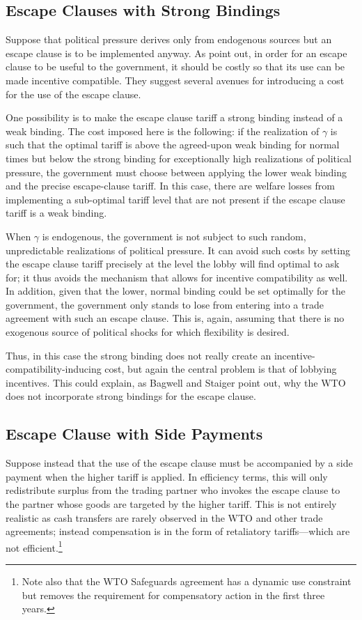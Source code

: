 \documentclass[12pt]{article}
\newcommand{\ga}{\gamma}
\begin{document}
\subsection{Escape Clauses with Strong Bindings}
Suppose that political pressure derives only from endogenous sources but an escape clause is to be implemented anyway. As \Textcite{bs2005} point out, in order for an escape clause to be useful to the government, it should be costly so that its use can be made incentive compatible. They suggest several avenues for introducing a cost for the use of the escape clause.

One possibility is to make the escape clause tariff a strong binding instead of a weak binding. The cost imposed here is the following: if the realization of $\ga$ is such that the optimal tariff is above the agreed-upon weak binding for normal times but below the strong binding for exceptionally high realizations of political pressure, the government must choose between applying the lower weak binding and the precise escape-clause tariff. In this case, there are welfare losses from implementing a sub-optimal tariff level that are not present if the escape clause tariff is a weak binding.

When $\ga$ is endogenous, the government is not subject to such random, unpredictable realizations of political pressure. It can avoid such costs by setting the escape clause tariff precisely at the level the lobby will find optimal to ask for; it thus avoids the mechanism that allows for incentive compatibility as well. In addition, given that the lower, normal binding could be set optimally for the government, the government only stands to lose from entering into a trade agreement with such an escape clause. This is, again, assuming that there is no exogenous source of political shocks for which flexibility is desired.

Thus, in this case the strong binding does not really create an incentive-compatibility-inducing cost, but again the central problem is that of lobbying incentives. This could explain, as Bagwell and Staiger point out, why the WTO does not incorporate strong bindings for the escape clause.

\subsection{Escape Clause with Side Payments}
Suppose instead that the use of the escape clause must be accompanied by a side payment when the higher tariff is applied. In efficiency terms, this will only redistribute surplus from the trading partner who invokes the escape clause to the partner whose goods are targeted by the higher tariff. This is not entirely realistic as cash transfers are rarely observed in the WTO and other trade agreements; instead compensation is in the form of retaliatory tariffs---which are not efficient.\footnote{Note also that the WTO Safeguards agreement has a dynamic use constraint but removes the requirement for compensatory action in the first three years.}
\end{document}
